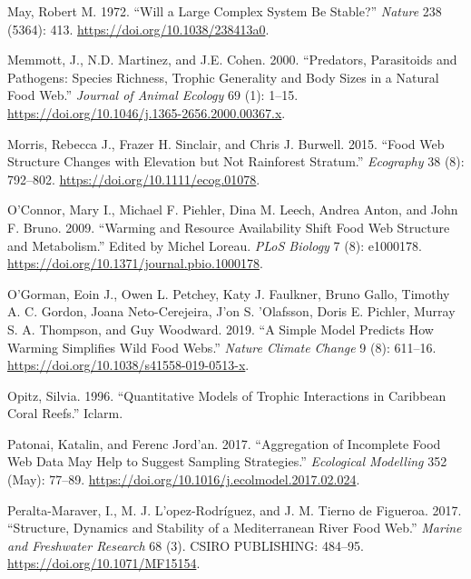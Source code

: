 \documentclass{article}
\begin{document}
\leavevmode\hypertarget{ref-mayWillLargeComplex1972}{}%
May, Robert M. 1972. ``Will a Large Complex System Be Stable?''
\emph{Nature} 238 (5364): 413. \url{https://doi.org/10.1038/238413a0}.

\leavevmode\hypertarget{ref-memmottPredatorsParasitoidsPathogens2000}{}%
Memmott, J., N.D. Martinez, and J.E. Cohen. 2000. ``Predators,
Parasitoids and Pathogens: Species Richness, Trophic Generality and Body
Sizes in a Natural Food Web.'' \emph{Journal of Animal Ecology} 69 (1):
1--15. \url{https://doi.org/10.1046/j.1365-2656.2000.00367.x}.

\leavevmode\hypertarget{ref-morrisFoodWebStructure2015}{}%
Morris, Rebecca J., Frazer H. Sinclair, and Chris J. Burwell. 2015.
``Food Web Structure Changes with Elevation but Not Rainforest
Stratum.'' \emph{Ecography} 38 (8): 792--802.
\url{https://doi.org/10.1111/ecog.01078}.

\leavevmode\hypertarget{ref-oconnorWarmingResourceAvailability2009}{}%
O'Connor, Mary I., Michael F. Piehler, Dina M. Leech, Andrea Anton, and
John F. Bruno. 2009. ``Warming and Resource Availability Shift Food Web
Structure and Metabolism.'' Edited by Michel Loreau. \emph{PLoS Biology}
7 (8): e1000178. \url{https://doi.org/10.1371/journal.pbio.1000178}.

\leavevmode\hypertarget{ref-ogormanSimpleModelPredicts2019}{}%
O'Gorman, Eoin J., Owen L. Petchey, Katy J. Faulkner, Bruno Gallo,
Timothy A. C. Gordon, Joana Neto-Cerejeira, J\a'on S. \a'Olafsson, Doris
E. Pichler, Murray S. A. Thompson, and Guy Woodward. 2019. ``A Simple
Model Predicts How Warming Simplifies Wild Food Webs.'' \emph{Nature
Climate Change} 9 (8): 611--16.
\url{https://doi.org/10.1038/s41558-019-0513-x}.

\leavevmode\hypertarget{ref-opitz1996}{}%
Opitz, Silvia. 1996. ``Quantitative Models of Trophic Interactions in
Caribbean Coral Reefs.'' Iclarm.

\leavevmode\hypertarget{ref-patonaiAggregationIncompleteFood2017}{}%
Patonai, Katalin, and Ferenc Jord\a'an. 2017. ``Aggregation of
Incomplete Food Web Data May Help to Suggest Sampling Strategies.''
\emph{Ecological Modelling} 352 (May): 77--89.
\url{https://doi.org/10.1016/j.ecolmodel.2017.02.024}.

\leavevmode\hypertarget{ref-peralta-maraverStructureDynamicsStability2017}{}%
Peralta-Maraver, I., M. J. L\a'opez-Rodríguez, and J. M. Tierno de
Figueroa. 2017. ``Structure, Dynamics and Stability of a Mediterranean
River Food Web.'' \emph{Marine and Freshwater Research} 68 (3). CSIRO
PUBLISHING: 484--95. \url{https://doi.org/10.1071/MF15154}.
\end{document}
